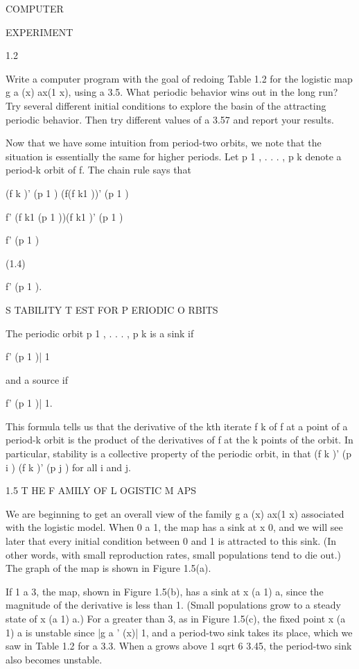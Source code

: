 \documentclass[12pt]{article}
\begin{document}
COMPUTER

EXPERIMENT

1.2

Write a computer program with the goal of redoing Table 1.2 for the logistic map g a (x)  ax(1  x), using a  
3.5. What periodic behavior wins out in the long run? Try several different initial conditions to explore 
the basin of the attracting periodic behavior. Then try different values of a  3.57 and report your 
results.

Now that we have some intuition from period-two orbits, we note that the situation is essentially the same 
for higher periods. Let p 1 , . . . , p k  denote a period-k orbit of f. The chain rule says that

(f k )' (p 1 )  (f(f k1 ))' (p 1 )

 f' (f k1 (p 1 ))(f k1 )' (p 1 )

 f' (p 1 )

(1.4)

 f' (p 1 ).

S TABILITY T EST FOR P ERIODIC O RBITS

The periodic orbit p 1 , . . . , p k  is a sink if

 f' (p 1 )|  1

and a source if

 f' (p 1 )| 
 1.


This formula tells us that the derivative of the kth iterate f k of f at a point of a period-k orbit is the 
product of the derivatives of f at the k points of the orbit. In particular, stability is a collective 
property of the periodic orbit, in that (f k )' (p i )  (f k )' (p j ) for all i and j.

1.5 T HE F AMILY OF L OGISTIC M APS

We are beginning to get an overall view of the family g a (x)  ax(1  x) associated with the logistic model. 
When 0 a  1, the map has a sink at x  0, and we will see later that every initial condition between 0 and 1 
is attracted to this sink. (In other words, with small reproduction rates, small populations tend to die 
out.) The graph of the map is shown in Figure 1.5(a).

If 1  a  3, the map, shown in Figure 1.5(b), has a sink at x  (a  1)  a, since the magnitude of the 
derivative is less than 1. (Small populations grow to a steady state of x  (a  1)  a.) For a greater than 
3, as in Figure 1.5(c), the fixed point x  (a  1)  a is unstable since |g a ' (x)| 
 1, and a period-two sink takes its place, which we saw in Table 1.2 for a  3.3. When a grows above 1 sqrt 6  
3.45, the period-two sink also becomes unstable.
\end{document}
